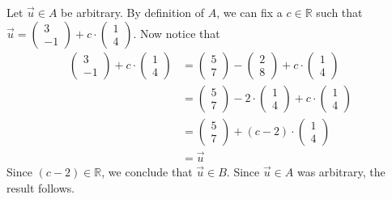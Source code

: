 \documentclass[12pt]{article}
\newenvironment{problem}[2][Problem]
{
	\begin{trivlist} 
		\item[\hskip \labelsep {\bfseries #1 #2:}]
	}
{
	\end{trivlist}
	}
\newenvironment{solution}[1][Solution]
{
	\begin{trivlist} 
		\item[\hskip \labelsep {\itshape #1:}]
	}
	{
	\end{trivlist}
}
\begin{document}
\begin{problem}{4}
\begin{solution}
Let $\vec{u} \in A$ be arbitrary. By definition of $A$, we can fix a $c \in \mathbb{R}$ such that $\vec{u}= \begin{pmatrix} 3 \\ -1 \end{pmatrix} + c \cdot \begin{pmatrix} 1 \\ 4 \end{pmatrix}$. Now notice that 
\begin{align*}
\begin{pmatrix} 3 \\ -1 \end{pmatrix} + c \cdot \begin{pmatrix} 1 \\ 4 \end{pmatrix} &=  \begin{pmatrix} 5 \\ 7 \end{pmatrix} - \begin{pmatrix} 2 \\ 8 \end{pmatrix}  + c \cdot \begin{pmatrix} 1 \\ 4 \end{pmatrix}\\
&=\begin{pmatrix} 5 \\ 7 \end{pmatrix} - 2\cdot \begin{pmatrix} 1 \\ 4 \end{pmatrix}  + c \cdot \begin{pmatrix} 1 \\ 4 \end{pmatrix} \\
&= \begin{pmatrix} 5 \\ 7 \end{pmatrix} + (c-2) \cdot \begin{pmatrix} 1 \\ 4 \end{pmatrix}\\
&=\vec{u}
\end{align*}
Since $(c-2) \in \mathbb{R}$, we conclude that $\vec{u} \in B$. Since $\vec{u} \in A$ was arbitrary, the result follows.

\end{solution}


\end{problem}
\end{document}
